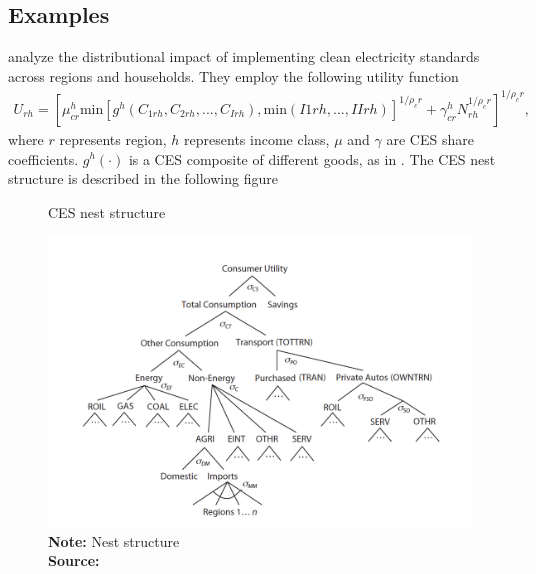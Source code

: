 \subsection{Examples}
\cite{RAUSCH2014556} analyze the distributional impact of implementing clean electricity standards across regions and households. They employ the following utility function
\begin{align}
   U_{rh} = [\mu_{cr}^h \text{min}[g^h(C_{1rh},C_{2rh},...,C_{Irh}),\text{min}(I{1rh},...,I{Irh})]^{1/\rho_cr} + \gamma_{cr}^h N_{rh}^{1/\rho_cr}]^{1/\rho_cr},
\end{align}
where $r$ represents region, $h$ represents income class, $\mu$ and $\gamma$ are CES share coefficients. $g^h(\cdot)$ is a CES composite of different goods, as in \citep{paltsev2005emissions}. The CES nest structure is described in the following figure
\begin{figure}[H]
\centering
\caption{\cite{paltsev2005emissions} CES nest structure}
\label{paltsev nest}
\includegraphics[width=\textwidth]{Screenshots/paltsev CES-nest.png}
\captionsetup{singlelinecheck=off,size=scriptsize}
\setlength{\captionmargin}{10pt}
\caption*{
\textbf{Note:} Nest structure\\
\textbf{Source:} \cite{paltsev2005emissions}}
\end{figure}



